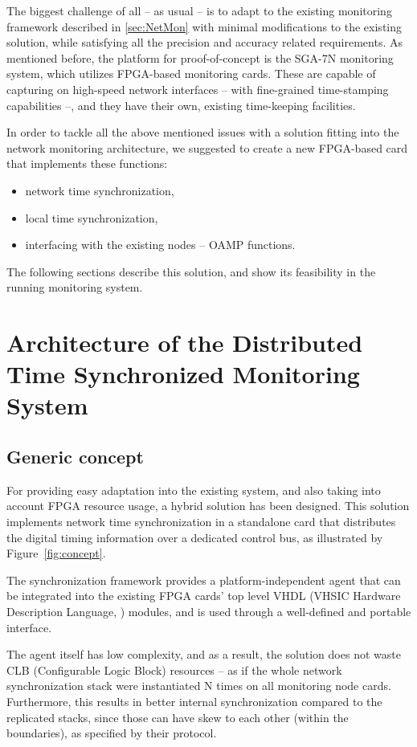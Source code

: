 \documentclass[journal]{IEEEtran}
\begin{document}
The biggest challenge of all -- as usual -- is to adapt to the existing monitoring framework described in
\ref{sec:NetMon}
with minimal modifications to the existing solution, while satisfying all the precision and accuracy related requirements.
As mentioned before, the platform for proof-of-concept is the SGA-7N monitoring system, which utilizes FPGA-based monitoring cards. These are capable of capturing on high-speed network interfaces -- with fine-grained time-stamping capabilities --, and they have their own, existing time-keeping facilities.

In order to tackle all the above mentioned issues with a solution fitting into the network monitoring architecture, we suggested to create a new FPGA-based card that implements these functions:
\begin{itemize}
    \item network time synchronization,
    \item local time synchronization,
    \item interfacing with the existing nodes -- OAMP functions.
\end{itemize}

The following sections describe this solution, and show its feasibility in the running monitoring system.

\IEEEpubidadjcol %

\section{Architecture of the Distributed Time Synchronized Monitoring System}

\subsection{Generic concept}
For providing easy adaptation into the existing system, and also taking into account FPGA resource usage, a hybrid
solution
has been designed. This solution implements network time synchronization in a standalone card that distributes the digital timing
information over a dedicated control bus, as illustrated by Figure~\ref{fig:concept}.

The synchronization framework provides a platform-independent agent that
can be integrated into the existing FPGA cards' top level VHDL (VHSIC Hardware Description Language, \cite{VHDL_standard}) modules, and is used through a well-defined and portable interface.

The agent itself has low complexity, and as a result, the solution does not waste CLB (Configurable Logic Block) resources -- as if the whole network
synchronization stack were instantiated N times on all monitoring node cards. Furthermore, this results in better internal
synchronization
compared to the replicated stacks, since those can have skew to each other (within the boundaries), as specified by their
protocol.
\end{document}
